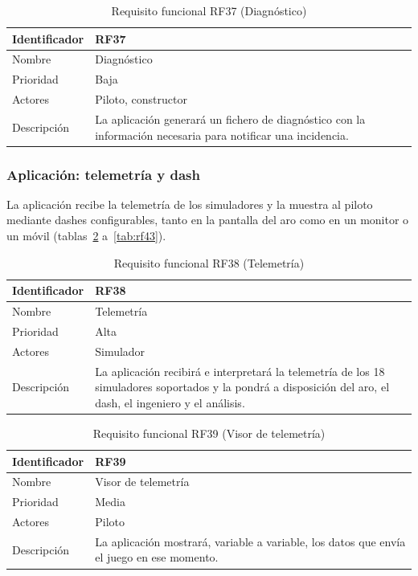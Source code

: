 \begin{table}[H]
	\centering
	\renewcommand{\arraystretch}{2}
	\begin{tabular}{|l|p{10cm}|}
		\hline
		Identificador & RF37 \\
		\hline
		Nombre & Diagnóstico \\
		\hline
		Prioridad & Baja \\
		\hline
		Actores & Piloto, constructor \\
		\hline
		Descripción & La aplicación generará un fichero de diagnóstico con la información necesaria para notificar una incidencia. \\
		\hline
	\end{tabular}
	\caption{Requisito funcional RF37 (Diagnóstico)}
	\label{tab:rf37}
\end{table}

\subsubsection{Aplicación: telemetría y dash}

La aplicación recibe la telemetría de los simuladores y la muestra al piloto mediante dashes configurables, tanto en la pantalla del aro como en un monitor o un móvil (tablas~\ref{tab:rf38} a~\ref{tab:rf43}).

\begin{table}[H]
	\centering
	\renewcommand{\arraystretch}{2}
	\begin{tabular}{|l|p{10cm}|}
		\hline
		Identificador & RF38 \\
		\hline
		Nombre & Telemetría \\
		\hline
		Prioridad & Alta \\
		\hline
		Actores & Simulador \\
		\hline
		Descripción & La aplicación recibirá e interpretará la telemetría de los 18 simuladores soportados y la pondrá a disposición del aro, el dash, el ingeniero y el análisis. \\
		\hline
	\end{tabular}
	\caption{Requisito funcional RF38 (Telemetría)}
	\label{tab:rf38}
\end{table}

\begin{table}[H]
	\centering
	\renewcommand{\arraystretch}{2}
	\begin{tabular}{|l|p{10cm}|}
		\hline
		Identificador & RF39 \\
		\hline
		Nombre & Visor de telemetría \\
		\hline
		Prioridad & Media \\
		\hline
		Actores & Piloto \\
		\hline
		Descripción & La aplicación mostrará, variable a variable, los datos que envía el juego en ese momento. \\
		\hline
	\end{tabular}
	\caption{Requisito funcional RF39 (Visor de telemetría)}
	\label{tab:rf39}
\end{table}

